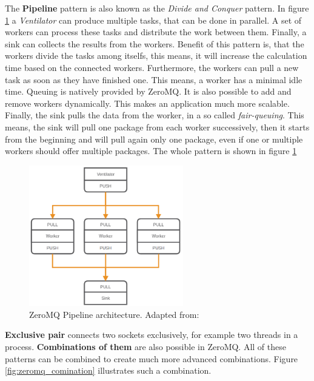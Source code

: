 The \textbf{Pipeline} pattern is also known as the \textit{Divide and Conquer} pattern.
In figure \ref{fig:zeromq_pipeline} a \textit{Ventilator} can produce multiple tasks, that can be done in parallel.\autocite{ZeroMQ:Guide}
A set of workers can process these tasks and distribute the work between them.\autocite{ZeroMQ:Guide}
Finally, a sink can collects the results from the workers.\autocite{ZeroMQ:Guide}
Benefit of this pattern is, that the workers divide the tasks among itselfs, this means, it will increase the calculation time based on the connected workers.
Furthermore, the workers can pull a new task as soon as they have finished one.
This means, a worker has a minimal idle time.
Queuing is natively provided by ZeroMQ.
It is also possible to add and remove workers dynamically.
This makes an application much more scalable.
Finally, the sink pulls the data from the worker, in a so called \textit{fair-queuing}.
This means, the sink will pull one package from each worker successively, then it starts from the beginning and will pull again only one package, even if one or multiple workers should offer multiple packages.
The whole pattern is shown in figure \ref{fig:zeromq_pipeline}\newline

\begin{figure}[H]
    \centering
    \includegraphics[width=0.6\textwidth]{resources/images/zeromq-vernitlator.png}
    \caption[ZeroMQ Pipeline architecture]{ZeroMQ Pipeline architecture. Adapted from: \autocite{ZeroMQ:Guide}}
    \label{fig:zeromq_pipeline}
\end{figure}

\textbf{Exclusive pair} connects two sockets exclusively, for example two threads in a process.\autocite{ZeroMQ:Guide}
\newline
\textbf{Combinations of them} are also possible in ZeroMQ.
All of these patterns can be combined to create much more advanced combinations.
Figure \ref{fig:zeromq_comination} illustrates such a combination.\newline

